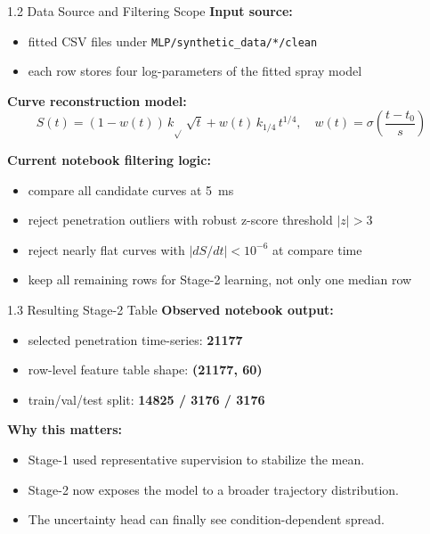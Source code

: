 \documentclass[UTF8,aspectratio=169]{ctexbeamer}
\begin{document}
\begin{frame}{1.2 Data Source and Filtering Scope}
\textbf{Input source:}
\begin{itemize}
  \item fitted CSV files under \texttt{MLP/synthetic\_data/*/clean}
  \item each row stores four log-parameters of the fitted spray model
\end{itemize}

\vspace{0.3em}
\textbf{Curve reconstruction model:}
\[
S(t) = (1-w(t))\,k_{\sqrt{}}\,\sqrt{t} + w(t)\,k_{1/4}\,t^{1/4},
\quad
w(t)=\sigma\!\left(\frac{t-t_0}{s}\right)
\]

\vspace{0.3em}
\textbf{Current notebook filtering logic:}
\begin{itemize}
  \item compare all candidate curves at \SI{5}{ms}
  \item reject penetration outliers with robust z-score threshold $|z|>3$
  \item reject nearly flat curves with $|dS/dt| < 10^{-6}$ at compare time
  \item keep all remaining rows for Stage-2 learning, not only one median row
\end{itemize}
\end{frame}

\begin{frame}{1.3 Resulting Stage-2 Table}
\textbf{Observed notebook output:}
\begin{itemize}
  \item selected penetration time-series: \textbf{\num{21177}}
  \item row-level feature table shape: \textbf{(\num{21177}, 60)}
  \item train/val/test split: \textbf{\num{14825} / \num{3176} / \num{3176}}
\end{itemize}

\vspace{0.4em}
\textbf{Why this matters:}
\begin{itemize}
  \item Stage-1 used representative supervision to stabilize the mean.
  \item Stage-2 now exposes the model to a broader trajectory distribution.
  \item The uncertainty head can finally see condition-dependent spread.
\end{itemize}
\end{frame}
\end{document}

